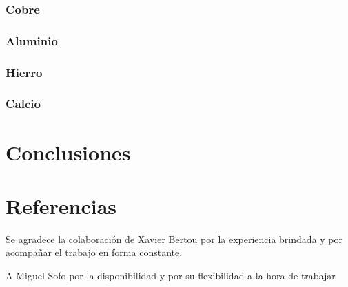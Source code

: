     \subsubsection{Cobre}

    \subsubsection{Aluminio}

    \subsubsection{Hierro}

    \subsubsection{Calcio}
    
    \section{Conclusiones}
    
  

    \section{Referencias}\label{}
    
    
    
    
    
    
    \begin{acknowledgments}
    Se agradece la colaboración de Xavier Bertou por la experiencia brindada y por
    acompañar el trabajo en forma constante.

    A Miguel Sofo por la disponibilidad y por su flexibilidad a la hora de trabajar

    \end{acknowledgments}
    
